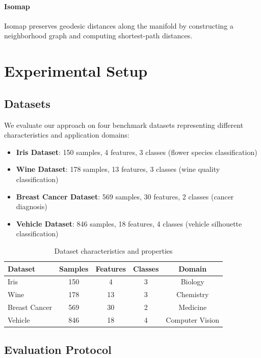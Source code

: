 \documentclass[review]{elsarticle}
\begin{document}
\paragraph{Isomap}
Isomap preserves geodesic distances along the manifold by constructing a neighborhood graph and computing shortest-path distances.

\section{Experimental Setup}
\label{sec:experimental}

\subsection{Datasets}

We evaluate our approach on four benchmark datasets representing different characteristics and application domains:

\begin{itemize}
\item \textbf{Iris Dataset}: 150 samples, 4 features, 3 classes (flower species classification)
\item \textbf{Wine Dataset}: 178 samples, 13 features, 3 classes (wine quality classification)
\item \textbf{Breast Cancer Dataset}: 569 samples, 30 features, 2 classes (cancer diagnosis)
\item \textbf{Vehicle Dataset}: 846 samples, 18 features, 4 classes (vehicle silhouette classification)
\end{itemize}

\begin{table}[h]
\centering
\caption{Dataset characteristics and properties}
\label{tab:datasets}
\begin{tabular}{lcccc}
\toprule
\textbf{Dataset} & \textbf{Samples} & \textbf{Features} & \textbf{Classes} & \textbf{Domain} \\
\midrule
Iris & 150 & 4 & 3 & Biology \\
Wine & 178 & 13 & 3 & Chemistry \\
Breast Cancer & 569 & 30 & 2 & Medicine \\
Vehicle & 846 & 18 & 4 & Computer Vision \\
\bottomrule
\end{tabular}
\end{table}

\subsection{Evaluation Protocol}
\end{document}
